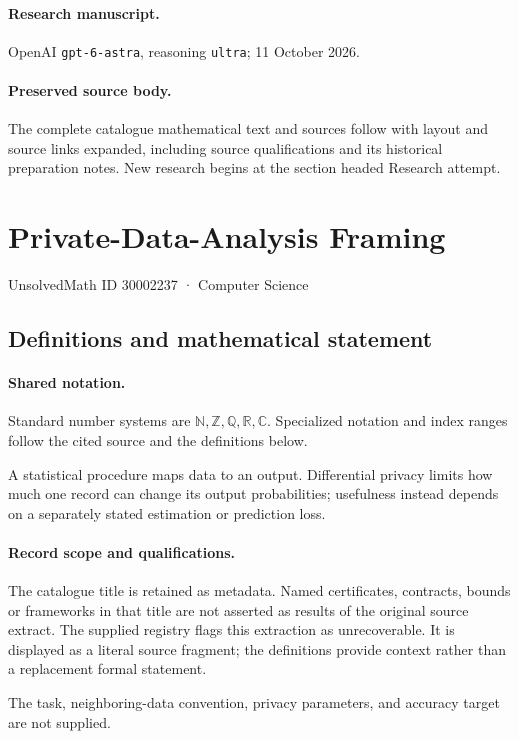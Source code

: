 \documentclass[11pt]{article}
\begin{document}
\paragraph{Research manuscript.} OpenAI \texttt{gpt-6-astra}, reasoning \texttt{ultra}; 11 October 2026.
\paragraph{Preserved source body.} The complete catalogue mathematical text and sources follow with layout and source links expanded, including source qualifications and its historical preparation notes. New research begins at the section headed Research attempt.

\section{Private-Data-Analysis Framing}\label{30002237}
{\small UnsolvedMath ID 30002237 · Computer Science}
\subsection{Definitions and mathematical statement}

\paragraph{Shared notation.}Standard number systems are $\mathbb N,\mathbb Z,\mathbb Q,\mathbb R,\mathbb C$. Specialized notation and index ranges follow the cited source and the definitions below.


A statistical procedure maps data to an output. Differential privacy limits how much one record can change its output probabilities; usefulness instead depends on a separately stated estimation or prediction loss.
\paragraph{Record scope and qualifications.}
The catalogue title is retained as metadata. Named certificates, contracts, bounds or frameworks in that title are not asserted as results of the original source extract.
The supplied registry flags this extraction as unrecoverable. It is displayed as a literal source fragment; the definitions provide context rather than a replacement formal statement.

The task, neighboring-data convention, privacy parameters, and accuracy target are not supplied.
\end{document}
